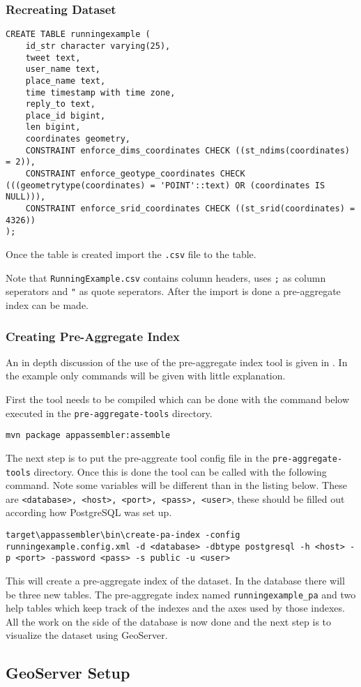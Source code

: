 \subsubsection{Recreating Dataset}
\begin{lstlisting}
CREATE TABLE runningexample (
	id_str character varying(25),
	tweet text,
	user_name text,
	place_name text,
	time timestamp with time zone,
	reply_to text,
	place_id bigint,
	len bigint,
	coordinates geometry,
	CONSTRAINT enforce_dims_coordinates CHECK ((st_ndims(coordinates) = 2)),
	CONSTRAINT enforce_geotype_coordinates CHECK (((geometrytype(coordinates) = 'POINT'::text) OR (coordinates IS NULL))),
	CONSTRAINT enforce_srid_coordinates CHECK ((st_srid(coordinates) = 4326))
);
\end{lstlisting}
Once the table is created import the \lstinline|.csv| file to the table.

Note that \lstinline|RunningExample.csv| contains column headers, uses \lstinline|;| as column seperators and \lstinline|"| as quote seperators. After the import is done a pre-aggregate index can be made.


\subsubsection{Creating Pre-Aggregate Index}
\label{sec:examplePreAggIndex}
An in depth discussion of the use of the pre-aggregate index tool is given in . In the example only commands will be given with little explanation.

First the tool needs to be compiled which can be done with the command below executed in the \lstinline|pre-aggregate-tools| directory.
\begin{lstlisting}
mvn package appassembler:assemble
\end{lstlisting}
The next step is to put the pre-aggreate tool config file in the \lstinline|pre-aggregate-tools| directory. Once this is done the tool can be called with the following command. Note some variables will be different than in the listing below. These are \lstinline|<database>, <host>, <port>, <pass>, <user>|, these should be filled out according how PostgreSQL was set up.
\begin{lstlisting}
target\appassembler\bin\create-pa-index -config runningexample.config.xml -d <database> -dbtype postgresql -h <host> -p <port> -password <pass> -s public -u <user>
\end{lstlisting}
This will create a pre-aggregate index of the dataset. In the database there will be three new tables. The pre-aggregate index named \lstinline|runningexample_pa| and two help tables which keep track of the indexes and the axes used by those indexes. All the work on the side of the database is now done and the next step is to visualize the dataset using GeoServer.

\pagebreak
\subsection{GeoServer Setup}
\label{sec:exampleGeoServer}

